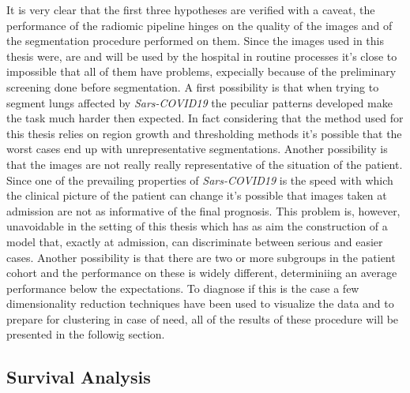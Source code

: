 It is very clear that the first three hypotheses are verified with a caveat, the performance of the radiomic pipeline hinges on the quality of the images and of the segmentation procedure performed on them. Since the images used in this thesis were, are and will be used by the hospital in routine processes it's close to impossible that all of them have problems, expecially because of the preliminary screening done before segmentation.
A first possibility is that when trying to segment lungs affected by \textit{Sars-COVID19} the peculiar patterns developed make the task much harder then expected.
In fact considering that the method used for this thesis relies on region growth and thresholding methods it's possible that the worst cases end up with unrepresentative segmentations.
Another possibility is that the images are not really really representative of the situation of the patient. Since one of the prevailing properties of \textit{Sars-COVID19} is the speed with which the clinical picture of the patient can change it's possible that images taken at admission are not as informative of the final prognosis. This problem is, however, unavoidable in the setting of this thesis which has as aim the construction of a model that, exactly at admission, can discriminate between serious and easier cases.
Another possibility is that there are two or more subgroups in the patient cohort and the performance on these is widely different, determiniing an average performance below the expectations.
To diagnose if this is the case a few dimensionality reduction techniques have been used to visualize the data and to prepare for clustering in case of need, all of the results of these procedure will be presented in the followig section.

\subsection{Survival Analysis}